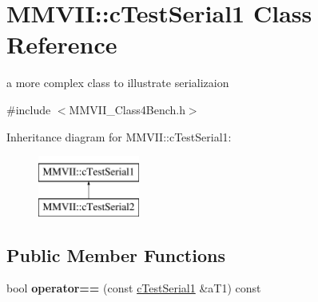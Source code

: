 \hypertarget{classMMVII_1_1cTestSerial1}{}\section{M\+M\+V\+II\+:\+:c\+Test\+Serial1 Class Reference}
\label{classMMVII_1_1cTestSerial1}


a more complex class to illustrate serializaion  




{\ttfamily \#include $<$M\+M\+V\+I\+I\+\_\+\+Class4\+Bench.\+h$>$}

Inheritance diagram for M\+M\+V\+II\+:\+:c\+Test\+Serial1\+:\begin{figure}[H]
\begin{center}
\leavevmode
\includegraphics[height=2.000000cm]{classMMVII_1_1cTestSerial1}
\end{center}
\end{figure}
\subsection*{Public Member Functions}
\begin{DoxyCompactItemize}
\item 
bool {\bfseries operator==} (const \hyperlink{classMMVII_1_1cTestSerial1}{c\+Test\+Serial1} \&a\+T1) const \hypertarget{classMMVII_1_1cTestSerial1_a708d39ed73152e6f03c456e479bb5d31}{}\label{classMMVII_1_1cTestSerial1_a708d39ed73152e6f03c456e479bb5d31}

\end{DoxyCompactItemize}
